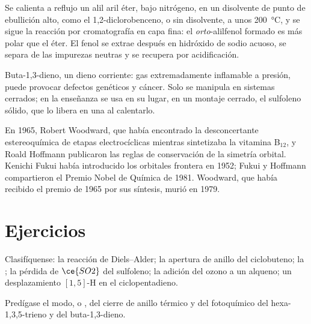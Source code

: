 \begin{inthelab}
Se calienta a reflujo un alil aril éter, bajo nitrógeno, en un disolvente de punto de ebullición
alto, como el 1,2-diclorobenceno, o sin disolvente, a unos \qty{200}{\celsius}, y
se sigue la reacción por cromatografía en capa fina: el \textit{orto}-alilfenol formado
es más polar que el éter. El fenol se extrae después en hidróxido de sodio acuoso,
se separa de las impurezas neutras y se recupera por acidificación.
\end{inthelab}

\begin{safety}{}
Buta-1,3-dieno, un dieno corriente: gas extremadamente inflamable a presión, puede provocar
defectos genéticos y cáncer. Solo se manipula en sistemas cerrados; en la enseñanza
se usa en su lugar, en un montaje cerrado, el sulfoleno sólido, que lo libera en una  al calentarlo.
\end{safety}

\begin{history}
En 1965, Robert Woodward, que había encontrado la desconcertante estereoquímica de
etapas electrocíclicas mientras sintetizaba la vitamina B$_{12}$, y Roald Hoffmann publicaron
las reglas de conservación de la simetría orbital. Kenichi Fukui había introducido los
orbitales frontera en 1952; Fukui y Hoffmann compartieron el Premio Nobel de
Química de 1981. Woodward, que había recibido el premio de 1965 por sus síntesis, murió en
1979.
\end{history}

\section{Ejercicios}

\begin{exercise}[$\star$]\label{exo:b3:pericyclic:1}
Clasifíquense: la reacción de Diels--Alder; la apertura de anillo del ciclobuteno; la ; la pérdida de $\ce{SO2}$ del sulfoleno; la adición del ozono a un alqueno;
un desplazamiento $[1,5]$-H en el ciclopentadieno.
\end{exercise}

\begin{exercise}[$\star$]\label{exo:b3:pericyclic:2}
Predígase el modo,  o , del cierre de anillo térmico y del
fotoquímico del hexa-1,3,5-trieno y del buta-1,3-dieno.
\end{exercise}

